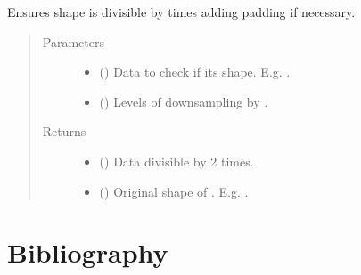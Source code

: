 \documentclass[letterpaper,10pt,english]{sphinxmanual}
\begin{document}

\begin{fulllineitems}
\label{\detokenize{utils/util:utils.util.check_downsample_division}}
Ensures  shape is divisible by  times  adding padding if necessary.
\begin{quote}\begin{description}
\item[{Parameters}] \leavevmode\begin{itemize}
\item {} 
 () \textendash{} Data to check if its shape.  E.g. .

\item {} 
 () \textendash{} Levels of downsampling by .

\end{itemize}

\item[{Returns}] \leavevmode
\begin{itemize}
\item {} 
 () \textendash{} Data divisible by 2  times.

\item {} 
 () \textendash{} Original shape of . E.g. .

\end{itemize}


\end{description}\end{quote}

\end{fulllineitems}



\section{Bibliography}
\label{\detokenize{bibliography:bibliography}}\label{\detokenize{bibliography::doc}}
\end{document}
